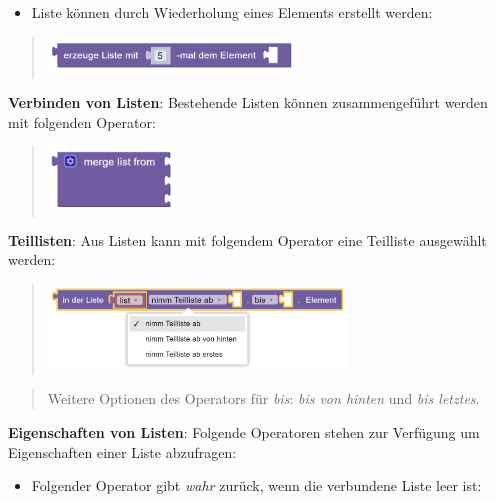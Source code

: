\documentclass[
  letterpaper,
  DIV=11]{scrreprt}
\providecommand{\tightlist}{%
  \setlength{\itemsep}{0pt}\setlength{\parskip}{0pt}}\usepackage{longtable,booktabs,array}
\begin{document}
\begin{tcolorbox}
\begin{itemize}
\tightlist
\item
  Liste können durch Wiederholung eines Elements erstellt werden:
\end{itemize}

\begin{quote}
\includegraphics[width=2.60417in,height=\textheight]{img/screenshot-blockly-element-creleate-lists-repeate-01-DEU.png}
\end{quote}

\textbf{Verbinden von Listen}: Bestehende Listen können zusammengeführt
werden mit folgenden Operator:

\begin{quote}
\includegraphics[width=1.35417in,height=\textheight]{img/screenshot-blockly-element-lists-merge-01-DEU.png}
\end{quote}

\textbf{Teillisten}: Aus Listen kann mit folgendem Operator eine
Teilliste ausgewählt werden:

\begin{quote}
\includegraphics[width=3.125in,height=\textheight]{img/screenshot-blockly-element-sub-list-01-DEU.png}
\end{quote}

\begin{quote}
Weitere Optionen des Operators für \emph{bis}: \emph{bis von hinten} und
\emph{bis letztes}.
\end{quote}

\textbf{Eigenschaften von Listen}: Folgende Operatoren stehen zur
Verfügung um Eigenschaften einer Liste abzufragen:

\begin{itemize}
\tightlist
\item
  Folgender Operator gibt \emph{wahr} zurück, wenn die verbundene Liste
  leer ist:
\end{itemize}


\end{tcolorbox}
\end{document}
